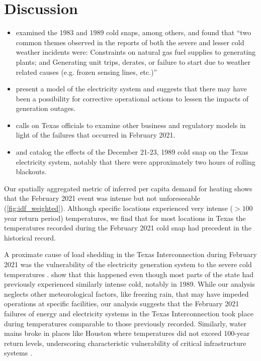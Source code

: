 \documentclass[12pt]{iopart}
\begin{document}
\section{Discussion}

\begin{itemize}
  \item \cite{nerc_previous:2013} examined the 1983 and 1989 cold snaps, among others, and found that ``two common themes observed in the reports of both the severe and lesser cold weather incidents were: Constraints on natural gas fuel supplies to generating plants; and Generating unit trips, derates, or failure to start due to weather related causes (e.g. frozen sensing lines, etc.)''
  \item \cite{wu_tx:2021} present a model of the electricity system and suggests that there may have been a possibility for corrective operational actions to lessen the impacts of generation outages.
  \item \cite{cartwright_lightsout:2021} calls on Texas officials to examine other business and regulatory models in light of the failures that occurred in February 2021.
  \item \cite{nerc_operation:1989} and \cite{osborne_twofreezes:2021} catalog the effects of the December 21-23, 1989 cold snap on the Texas electricity system, notably that there were approximately two hours of rolling blackouts.
\end{itemize}


Our spatially aggregated metric of inferred per capita demand for heating shows that the February 2021 event was intense but not unforeseeable (\cref{fig:idf_weighted}).
Although specific locations experienced very intense ($>100$ year return period) temperatures, we find that for most locations in Texas the temperatures recorded during the February 2021 cold snap had precedent in the historical record.

A proximate cause of load shedding in the Texas Interconnection during February 2021 was the vulnerability of the electricity generation system to the severe cold temperatures \cite{everhart_iea:2021}.
 show that this happened even though most parts of the state had previously experienced similarly intense cold, notably in 1989.
While our analysis neglects other meteorological factors, like freezing rain, that may have impeded operations at specific facilities, our analysis suggests that the February 2021 failures of energy and electricity systems in the Texas Interconnection took place during temperatures comparable to those previously recorded.
Similarly, water mains broke in places like Houston where temperatures did not exceed 100-year return levels, underscoring characteristic vulnerability of critical infrastructure systems \cite{chester_reliable:2020}.
\end{document}
